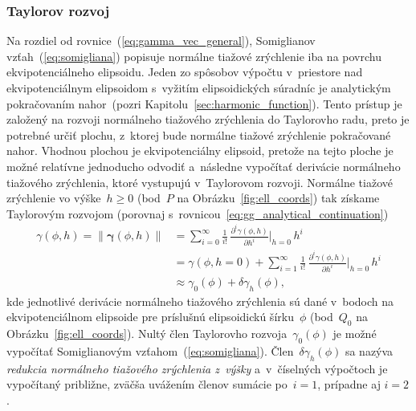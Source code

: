 \documentclass[a4paper,12pt]{book}
\begin{document}
\subsubsection{Taylorov rozvoj}

Na rozdiel od rovnice~(\ref{eq:gamma_vec_general}), Somiglianov 
vzťah~(\ref{eq:somigliana}) popisuje normálne tiažové zrýchlenie iba na povrchu 
ekvipotenciálneho elipsoidu.  Jeden zo spôsobov výpočtu v~priestore nad 
ekvipotenciálnym elipsoidom s~vyžitím elipsoidických súradníc je analytickým 
pokračovaním nahor~(pozri Kapitolu~\ref{sec:harmonic_function}).  Tento prístup 
je založený na rozvoji normálneho tiažového zrýchlenia do Taylorovho radu, 
preto je potrebné určiť plochu, z~ktorej bude normálne tiažové zrýchlenie 
pokračované nahor.  Vhodnou plochou je ekvipotenciálny elipsoid, pretože na 
tejto ploche je možné relatívne jednoducho odvodiť a~následne vypočítať 
derivácie normálneho tiažového zrýchlenia, ktoré vystupujú v~Taylorovom 
rozvoji.  Normálne tiažové zrýchlenie vo výške~$h \geq 0$ (bod~$P$ na 
Obrázku~\ref{fig:ell_coords}) tak získame Taylorovým rozvojom (porovnaj 
s~rovnicou~\ref{eq:gg_analytical_continuation})
%
\begin{equation}
\label{eq:gamma_taylor}
\begin{split}
\gamma(\phi, h) = \| \boldsymbol \gamma(\phi, h) \| &= \sum_{i = 0}^{\infty} 
\frac{1}{i!} \, \frac{\partial^i \gamma(\phi, h)}{\partial h^i} \bigg\lvert_{h 
= 0} \, h^i\\
%
&= \gamma(\phi, h = 0) + \sum_{i = 1}^{\infty} \frac{1}{i!} \, \frac{\partial^i 
\gamma(\phi, h)}{\partial h^i} \bigg\lvert_{h = 0} \, h^i\\
%
&\approx \gamma_0(\phi) + \delta\gamma_h(\phi){,}
\end{split}
\end{equation}
%
kde jednotlivé derivácie normálneho tiažového zrýchlenia sú dané v~bodoch na 
ekvipotenciálnom elipsoide pre príslušnú elipsoidickú šírku~$\phi$ (bod~$Q_0$ 
na Obrázku~\ref{fig:ell_coords}).  Nultý člen Taylorovho 
rozvoja~$\gamma_0(\phi)$ je možné vypočítať Somiglianovým 
vzťahom~(\ref{eq:somigliana}).  Člen~$\delta\gamma_h(\phi)$ sa nazýva 
\emph{redukcia normálneho tiažového zrýchlenia z~výšky} a~v~číselných výpočtoch 
je vypočítaný približne, zväčša uvážením členov sumácie po~$i = 1$, prípadne aj 
$i = 2$.
\end{document}
